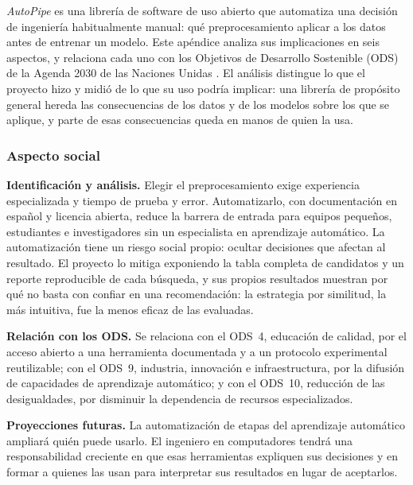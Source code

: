 
\textit{AutoPipe} es una librería de software de uso abierto que automatiza una decisión de
ingeniería habitualmente manual: qué preprocesamiento aplicar a los datos antes de entrenar
un modelo. Este apéndice analiza sus implicaciones en seis aspectos, y relaciona cada uno con
los Objetivos de Desarrollo Sostenible (ODS) de la Agenda 2030 de las Naciones Unidas
\cite{un2015agenda}. El análisis distingue lo que el proyecto hizo y midió de lo que su uso
podría implicar: una librería de propósito general hereda las consecuencias de los datos y
de los modelos sobre los que se aplique, y parte de esas consecuencias queda en manos de
quien la usa.

\subsubsection*{Aspecto social}

\textbf{Identificación y análisis.} Elegir el preprocesamiento exige experiencia
especializada y tiempo de prueba y error. Automatizarlo, con documentación en español y
licencia abierta, reduce la barrera de entrada para equipos pequeños, estudiantes e
investigadores sin un especialista en aprendizaje automático. La automatización tiene un
riesgo social propio: ocultar decisiones que afectan al resultado. El proyecto lo mitiga
exponiendo la tabla completa de candidatos y un reporte reproducible de cada búsqueda, y sus
propios resultados muestran por qué no basta con confiar en una recomendación: la estrategia
por similitud, la más intuitiva, fue la menos eficaz de las evaluadas.

\textbf{Relación con los ODS.} Se relaciona con el ODS~4, educación de calidad, por el
acceso abierto a una herramienta documentada y a un protocolo experimental reutilizable;
con el ODS~9, industria, innovación e infraestructura, por la difusión de capacidades de
aprendizaje automático; y con el ODS~10, reducción de las desigualdades, por disminuir la
dependencia de recursos especializados.

\textbf{Proyecciones futuras.} La automatización de etapas del aprendizaje automático
ampliará quién puede usarlo. El ingeniero en computadores tendrá una responsabilidad
creciente en que esas herramientas expliquen sus decisiones y en formar a quienes las usan
para interpretar sus resultados en lugar de aceptarlos.

